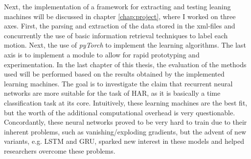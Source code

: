 	Next, the implementation of a framework for extracting and testing leaning machines will be discussed in chapter \ref{chap:project}, where I worked on three axes. First, the parsing and extraction of the data stored in the xml-files and concurrently the use of basic information retrieval techniques to label each motion. Next, the use of \textit{pyTorch} to implement the learning algorithms. The last axis is to implement a module to allow for rapid prototyping and experimentation.\newline
	In the last chapter of this thesis, the evaluation of the methods used will be performed based on the results obtained by the implemented learning machines. The goal is to investigate the claim that recurrent neural networks are more suitable for the task of HAR, as it is basically a time classification task at its core. Intuitively, these learning machines are the best fit, but the worth of the additional computational overhead is very questionable. Concordantly, these neural networks proved to be very hard to train due to their inherent problems, such as vanishing/exploding gradients, but the advent of new variants, e.g. LSTM and GRU, sparked new interest in these models and helped researchers overcome these problems.
